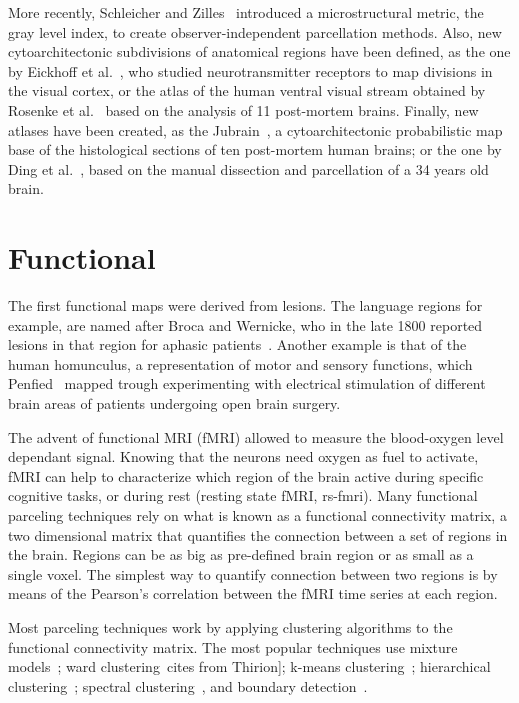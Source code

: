 More recently, Schleicher and Zilles~\cite{Schleicher1990} introduced a microstructural
metric, the gray level index, to create observer-independent parcellation methods.
Also, new cytoarchitectonic subdivisions of anatomical regions have been defined,
as the one by Eickhoff et al.~\cite{Eickhoff2008}, who studied neurotransmitter
receptors to map divisions in the visual cortex, or the atlas of the human
ventral visual stream obtained by Rosenke et al.~\cite{Rosenke2018} based on the
analysis of 11 post-mortem brains. Finally, new atlases have been created, as the 
Jubrain~\cite{Mohlberg2012}, a cytoarchitectonic probabilistic map base of the
histological sections of ten post-mortem human brains; or the one by
Ding et al.~\cite{Ding2016}, based on the manual dissection and parcellation
of a 34 years old brain.

\section{Functional}
\label{sec:functional}
The first functional maps were derived from lesions. The language regions for
example, are named after Broca and Wernicke, who in the late 1800 reported
lesions in that region for aphasic patients~\cite{Johns}. Another example is
that of the human homunculus, a representation of motor and sensory functions,
which Penfied~\cite{Schleicher1990} mapped trough experimenting with electrical
stimulation of different brain areas of patients undergoing open brain surgery.

The advent of functional MRI (fMRI) allowed to measure the blood-oxygen level
dependant signal. Knowing that the neurons need oxygen as fuel to activate,
fMRI can help to characterize which region of the brain active during specific
cognitive tasks, or during rest (resting state fMRI, rs-fmri). Many functional parceling
techniques rely on what is known as a functional connectivity matrix, a two
dimensional matrix that quantifies the connection between a set of regions
in the brain. Regions can be as big as pre-defined brain region or as small as
a single voxel. The simplest way to quantify connection between two regions is
by means of the Pearson's correlation between the fMRI time series at each region.

Most parceling techniques work by applying clustering algorithms to the
functional connectivity matrix. The most popular techniques use 
mixture models~\cite{Lashkari2010, Ryali2012}; ward clustering~\cite{Blumensath2013}cites from Thirion];
k-means clustering~\cite{Yeo2011, Shen2013, Kahnt2012}; hierarchical clustering~\cite{Eickhoff2011, Michel2011};
spectral clustering~\cite{Thirion2006, Craddock2011, Schaefer2017}, and
boundary detection~\cite{Gordon2016, Wig2014, Schaefer2017}.

